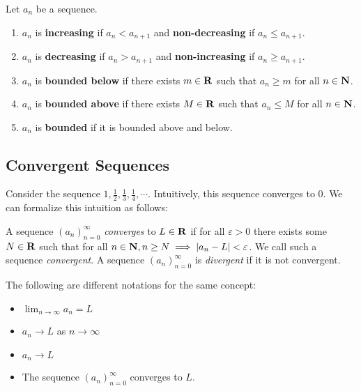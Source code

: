 \documentclass{article}
\begin{document}
    \begin{defi}
      Let \(a_n\) be a sequence.
      \begin{enumerate}
        \item \(a_n\) is \textbf{increasing} if \(a_n < a_{n+1}\) and \textbf{non-decreasing} if \(a_n \leq a_{n+1}\).
        \item \(a_n\) is \textbf{decreasing} if \(a_n > a_{n+1}\) and \textbf{non-increasing} if \(a_n \geq a_{n+1}\).
        \item \(a_n\) is \textbf{bounded below} if there exists \(m \in \mathbf{R}\) such that \(a_n \geq m\) for all \(n \in \mathbf{N}\).
        \item \(a_n\) is \textbf{bounded above} if there exists \(M \in \mathbf{R}\) such that \(a_n \leq M\) for all \(n \in \mathbf{N}\).
        \item \(a_n\) is \textbf{bounded} if it is bounded above and below.
      \end{enumerate}
    \end{defi}


    \subsection{Convergent Sequences}

    Consider the sequence \(1, \frac{1}{2}, \frac{1}{3}, \frac{1}{4},\cdots.\) Intuitively, this sequence converges to 0. We can formalize this intuition as follows:

    \begin{defi}
      A sequence \((a_n)_{n=0}^{\infty}\) \emph{converges} to \(L \in \mathbf{R}\) if for all \(\varepsilon > 0\) there exists some \(N \in \mathbf{R}\) such that for all \(n \in \mathbf{N}, n \geq N \implies \left\lvert a_n - L\right\rvert < \varepsilon\). We call such a sequence \emph{convergent}. A sequence \((a_n)_{n=0}^{\infty}\) is \emph{divergent} if it is not convergent.
    \end{defi}

    \begin{remark}
      The following are different notations for the same concept:
      \begin{itemize}
        \item \(\lim_{n \to \infty}a_n = L\)
        \item \(a_n \to L\) as \(n \to \infty\)
        \item \(a_n \to L\)
        \item The sequence \((a_n)_{n=0}^{\infty}\) converges to \(L\).
        \end{itemize}
    \end{remark} 
\end{document}
